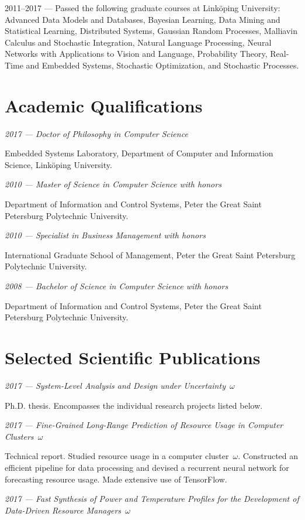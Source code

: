 \documentclass[journal]{IEEEtran}
\begin{document}
2011--2017 --- Passed the following graduate courses at Linköping University:
Advanced Data Models and Databases, Bayesian Learning, Data Mining and
Statistical Learning, Distributed Systems, Gaussian Random Processes, Malliavin
Calculus and Stochastic Integration, Natural Language Processing, Neural
Networks with Applications to Vision and Language, Probability Theory, Real-Time
and Embedded Systems, Stochastic Optimization, and Stochastic Processes.

\section{Academic Qualifications}
\emph{2017 --- Doctor of Philosophy in Computer Science}

Embedded Systems Laboratory, Department of Computer and Information Science,
Linköping University.

\emph{2010 --- Master of Science in Computer Science with honors}

Department of Information and Control Systems, Peter the Great Saint Petersburg
Polytechnic University.

\emph{2010 --- Specialist in Business Management with honors}

International Graduate School of Management, Peter the Great Saint Petersburg
Polytechnic University.

\emph{2008 --- Bachelor of Science in Computer Science with honors}

Department of Information and Control Systems, Peter the Great Saint Petersburg
Polytechnic University.

\section{Selected Scientific Publications}
\emph{2017 --- System-Level Analysis and Design under Uncertainty~$\omega$}

Ph.D. thesis. Encompasses the individual research projects listed below.

\emph{2017 --- Fine-Grained Long-Range Prediction of Resource Usage in Computer
Clusters~$\omega$}

Technical report. Studied resource usage in a computer cluster~$\omega$.
Constructed an efficient pipeline for data processing and devised a recurrent
neural network for forecasting resource usage. Made extensive use of TensorFlow.

\emph{2017 --- Fast Synthesis of Power and Temperature Profiles for the
Development of Data-Driven Resource Managers~$\omega$}
\end{document}
